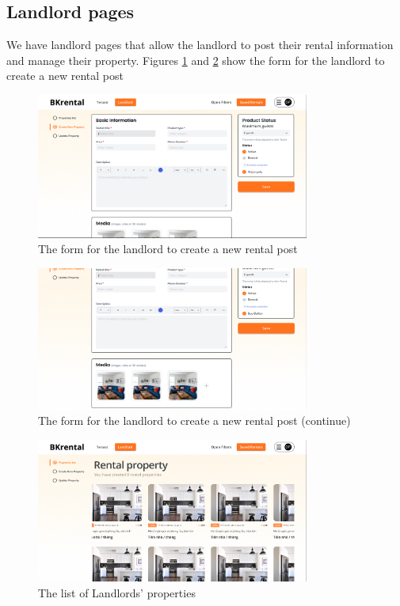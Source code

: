 \clearpage

\subsection{Landlord pages}
We have landlord pages that allow the landlord to post their rental information and manage their property. Figures \ref{fig:create-rental-1} and \ref{fig:create-rental-2} show the form for the landlord to create a new rental post

\begin{figure}[ht]
    \centering
    \includegraphics[width=0.8\textwidth]{Images/Mockup/create_rental_1.png}
    \caption{The form for the landlord to create a new rental post}
    \label{fig:create-rental-1}
\end{figure}

\begin{figure}[ht]
    \centering
    \includegraphics[width=0.8\textwidth]{Images/Mockup/create_rental_2.png}
    \caption{The form for the landlord to create a new rental post (continue)}
    \label{fig:create-rental-2}
\end{figure}

\clearpage

\begin{figure}[ht]
    \centering
    \includegraphics[width=0.8\textwidth]{Images/Mockup/property_list.png}
    \caption{The list of Landlords' properties}
    \label{fig:property_list}
\end{figure}

